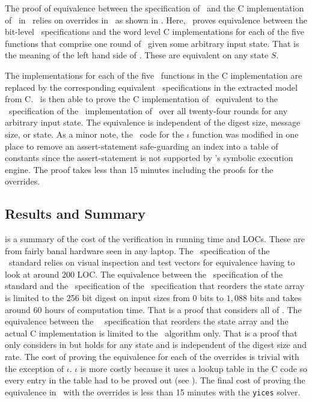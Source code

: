 The proof of equivalence between the specification of \keccak\ and the C implementation of \keccak\ in \openssl\ relies on overrides in \saw\ as shown in .
Here, \saw\ proves equivalence between the bit-level \cryptol\ specifications and the word level C implementations for each of the five functions that comprise one round of \keccak\ given some arbitrary input state.
That is the meaning of the left hand side of .
These are equivalent on any state $S$.

The implementations for each of the five \keccak\ functions in the C implementation are replaced by the corresponding equivalent \cryptol\ specifications in the extracted model from C.
\saw\ is then able to prove the C implementation of \keccak\ equivalent to the \cryptol\ specification of the \openssl\ implementation of \keccak\ over all twenty-four rounds for any arbitrary input state.
The equivalence is independent of the digest size, message size, or state.
As a minor note, the \openssl\ code for the $\iota$ function was modified in one place to remove an assert-statement safe-guarding an index into a table of constants since the assert-statement is not supported by \saw's symbolic execution engine. The proof takes less than 15 minutes including the proofs for the overrides.


\subsection{Results and Summary}

 is a summary of the cost of the verification in running time and LOCs. These are from fairly banal hardware seen in any laptop.
The \cryptol\ specification of the \fips\ standard relies on visual inspection and test vectors for equivalence having to look at around 200 LOC.
The equivalence between the \cryptol\ specification of the standard and the \cryptol\ specification of the \openssl\ specification that reorders the state array is limited to the 256 bit digest on input sizes from $0$ bits to $1,088$ bits and takes around 60 hours of computation time.
That is a proof that considers all of .
The equivalence between the \openssl\ \cryptol\ specification that reorders the state array and the actual C implementation is limited to the \keccak\ algorithm only.
That is a proof that only considers  in  but holds for any state and is independent of the digest size and rate.
The cost of proving the equivalence for each of the overrides is trivial with the exception of $\iota$.
$\iota$ is more costly because it uses a lookup table in the C code so every entry in the table had to be proved out (see ).
The final cost of proving the equivalence in \keccak\ with the overrides is less than 15 minutes with the \texttt{yices} solver.


